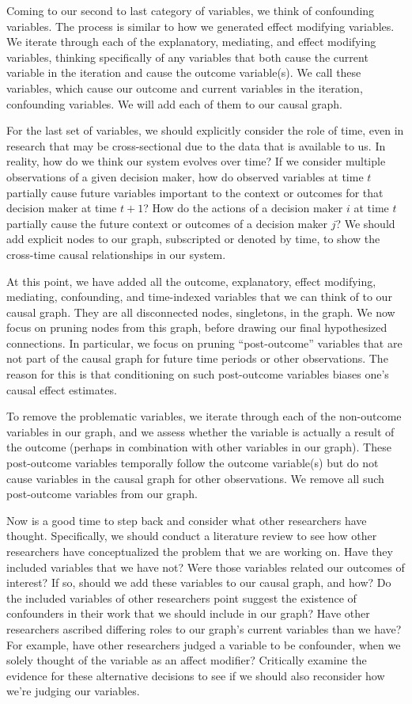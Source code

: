 Coming to our second to last category of variables, we think of confounding variables.
The process is similar to how we generated effect modifying variables.
We iterate through each of the explanatory, mediating, and effect modifying variables, thinking specifically of any variables that both cause the current variable in the iteration and cause the outcome variable(s).
We call these variables, which cause our outcome and current variables in the iteration, confounding variables.
We will add each of them to our causal graph.

For the last set of variables, we should explicitly consider the role of time, even in research that may be cross-sectional due to the data that is available to us.
In reality, how do we think our system evolves over time?
If we consider multiple observations of a given decision maker, how do observed variables at time $t$ partially cause future variables important to the context or outcomes for that decision maker at time $t+1$?
How do the actions of a decision maker $i$ at time $t$ partially cause the future context or outcomes of a decision maker $j$?
We should add explicit nodes to our graph, subscripted or denoted by time, to show the cross-time causal relationships in our system.

At this point, we have added all the outcome, explanatory, effect modifying, mediating, confounding, and time-indexed variables that we can think of to our causal graph.
They are all disconnected nodes, singletons, in the graph.
We now focus on pruning nodes from this graph, before drawing our final hypothesized connections.
In particular, we focus on pruning ``post-outcome'' variables that are not part of the causal graph for future time periods or other observations.
The reason for this is that conditioning on such post-outcome variables biases one's causal effect estimates.

To remove the problematic variables, we iterate through each of the non-outcome variables in our graph, and we assess whether the variable is actually a result of the outcome (perhaps in combination with other variables in our graph).
These post-outcome variables temporally follow the outcome variable(s) but do not cause variables in the causal graph for other observations.
We remove all such post-outcome variables from our graph.

Now is a good time to step back and consider what other researchers have thought.
Specifically, we should conduct a literature review to see how other researchers have conceptualized the problem that we are working on.
Have they included variables that we have not?
Were those variables related our outcomes of interest?
If so, should we add these variables to our causal graph, and how?
Do the included variables of other researchers point suggest the existence of confounders in their work that we should include in our graph?
Have other researchers ascribed differing roles to our graph's current variables than we have?
For example, have other researchers judged a variable to be confounder, when we solely thought of the variable as an affect modifier?
Critically examine the evidence for these alternative decisions to see if we should also reconsider how we're judging our variables.

